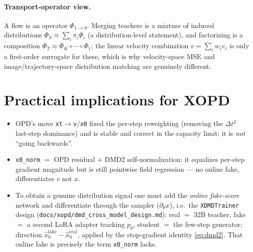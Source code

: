 \documentclass[11pt,a4paper]{article}
\newcommand{\xh}{\hat{x}_0}
\newcommand{\real}{\mathrm{real}}
\newcommand{\fake}{\mathrm{fake}}
\begin{document}
\paragraph{Transport-operator view.} A flow is an operator $\Phi_{1\to0}$. Merging teachers is a
mixture of induced distributions $\Phi_S\approx\sum_i\pi_i\Phi_i$ (a distribution-level statement),
and factorizing is a composition $\Phi_T\approx\Phi_K\circ\cdots\circ\Phi_1$; the linear
velocity combination $v=\sum_i w_i v_i$ is only a first-order surrogate for these, which is why
velocity-space MSE and image/trajectory-space distribution matching are genuinely different.

\section{Practical implications for XOPD}
\begin{itemize}[leftmargin=1.4em]
\item OPD's move \texttt{xt}$\to$\texttt{v}/\texttt{x0} fixed the per-step reweighting (removing the
$\Delta t^2$ last-step dominance) and is stable and correct in the capacity limit; it is
\emph{not} ``going backwards''.
\item \texttt{x0\_norm} $=$ OPD residual $+$ DMD2 self-normalization: it equalizes per-step gradient
magnitude but is still pointwise field regression --- no online fake, differentiates $v$ not $x$.
\item To obtain a genuine distribution signal one must add the \emph{online fake-score} network and
differentiate through the sampler ($\partial_\theta x$), i.e.\ the \texttt{XDMDTrainer} design
(\texttt{docs/xopd/dmd\_cross\_model\_design.md}): real $=$ 32B teacher, fake $=$ a second LoRA
adapter tracking $p_\theta$, student $=$ the few-step generator; direction
$\xh^{\fake}-\xh^{\real}$, applied by the stop-gradient identity \eqref{eq:dmd2}. That online fake
is precisely the term \texttt{x0\_norm} lacks.
\end{itemize}
\end{document}

